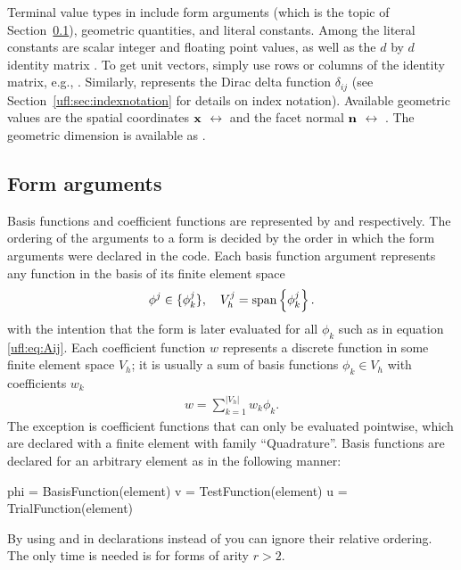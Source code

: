 Terminal value types in \ufl{} include form arguments (which is the
topic of Section~\ref{ufl:sec:arguments}), geometric quantities, and
literal constants.  Among the literal constants are scalar integer and
floating point values, as well as the $d$ by $d$ identity matrix
.  To get unit vectors, simply use rows or
columns of the identity matrix, e.g., .  Similarly,
 represents the Dirac delta function $\delta_{ij}$ (see
Section~\ref{ufl:sec:indexnotation} for details on index notation).
Available geometric values are the spatial coordinates $\mathbf{x}$
$\leftrightarrow$  and the facet normal $\mathbf{n}$
$\leftrightarrow$ .  The geometric dimension is
available as .

\subsection{Form arguments} \label{ufl:sec:arguments}

Basis functions and coefficient functions are represented by
 and  respectively. The ordering
of the arguments to a form is decided by the order in which the form
arguments were declared in the \ufl{} code.  Each basis function
argument represents any function in the basis of its finite element
space
\begin{align}
  \phi^j \in \{\phi_k^j\}, \quad V_h^j = \operatorname{span}\left\{ \phi_k^j \right\}.
\end{align}
with the intention that the form is later evaluated for all $\phi_k$
such as in equation \eqref{ufl:eq:Aij}.  Each coefficient function $w$
represents a discrete function in some finite element space $V_h$; it
is usually a sum of basis functions $\phi_k \in V_h$ with coefficients
$w_k$
\begin{align}
w = \sum_{k=1}^{|V_h|} w_k \phi_k.
\end{align}
The exception is coefficient functions that can only be evaluated
pointwise, which are declared with a finite element with family
``Quadrature''.  Basis functions are declared for an arbitrary element
as in the following manner:
\begin{code}
phi = BasisFunction(element)
v = TestFunction(element)
u = TrialFunction(element)
\end{code}
By using  and 
in declarations instead of 
you can ignore their relative ordering.
The only time  is needed
is for forms of arity $r > 2$.

